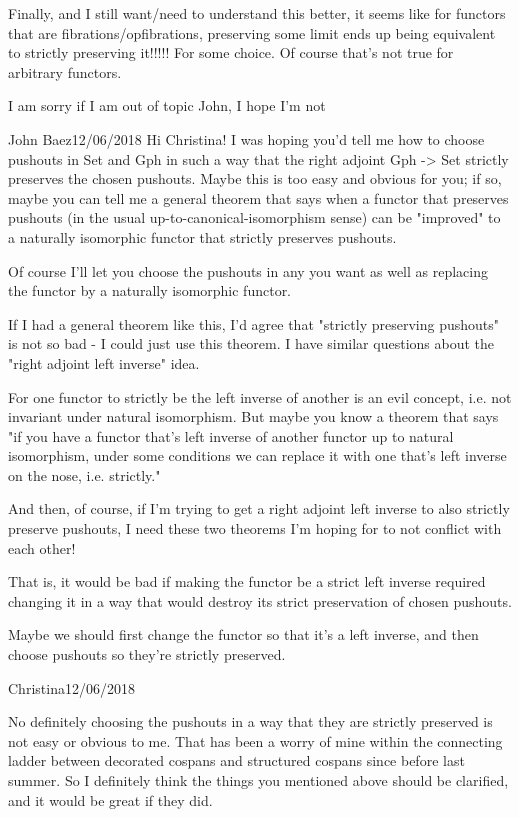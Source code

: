 \documentclass{amsart}
\begin{document}
Finally, and I still want/need to understand this better, it seems like for functors that are fibrations/opfibrations, preserving some limit ends up being equivalent to strictly preserving it!!!!! For some choice. Of course that's not true for arbitrary functors.

I am sorry if I am out of topic John, I hope I'm not

John Baez12/06/2018
Hi Christina!  I was hoping you'd tell me how to choose pushouts in Set and Gph in such a way that the right adjoint Gph -> Set strictly preserves the chosen pushouts.
Maybe this is too easy and obvious for you; if so, maybe you can tell me a general theorem that says when a functor that preserves pushouts (in the usual up-to-canonical-isomorphism sense) can be "improved" to a naturally isomorphic functor that strictly preserves pushouts.

Of course I'll let you choose the pushouts in any you want as well as replacing the functor by a naturally isomorphic functor.

If I had a general theorem like this, I'd agree that "strictly preserving pushouts" is not so bad - I could just use this theorem.
I have similar questions about the "right adjoint left inverse" idea.

For one functor to strictly be the left inverse of another is an evil concept, i.e. not invariant under natural isomorphism.   But maybe you know a theorem that says "if you have a functor that's left inverse of another functor up to natural isomorphism, under some conditions we can replace it with one that's left inverse on the nose, i.e. strictly."

And then, of course, if I'm trying to get a right adjoint left inverse to also strictly preserve pushouts, I need these two theorems I'm hoping for to not conflict with each other!

That is, it would be bad if making the functor be a strict left inverse required changing it in a way that would destroy its strict preservation of chosen pushouts.

Maybe we should first change the functor so that it's a left inverse, and then choose pushouts so they're strictly preserved.

Christina12/06/2018

No definitely choosing the pushouts in a way that they are strictly preserved is not easy or obvious to me. That has been a worry of mine within the connecting ladder between decorated cospans and structured cospans since before last summer. So I definitely think the things you mentioned above should be clarified, and it would be great if they did.
\end{document}
